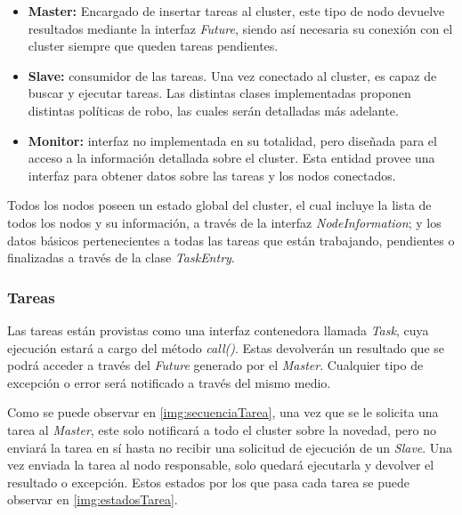 \documentclass[12pt,a4paper,oneside,spanish]{report}
\begin{document}
\begin{itemize}
	\item \textbf{Master:} Encargado de insertar tareas al cluster, este tipo de nodo devuelve resultados mediante la interfaz \textit{Future}, siendo así necesaria su conexión con el cluster siempre que queden tareas pendientes.
	\item \textbf{Slave:} consumidor de las tareas. Una vez conectado al cluster, es capaz de buscar y ejecutar tareas. Las distintas clases implementadas proponen distintas políticas de robo, las cuales serán detalladas más adelante.
	\item \textbf{Monitor:} interfaz no implementada en su totalidad, pero diseñada para el acceso a la información detallada sobre el cluster. Esta entidad provee una interfaz para obtener datos sobre las tareas y los nodos conectados.
\end{itemize}


Todos los nodos poseen un estado global del cluster, el cual incluye la lista de todos los nodos y su información, a través de la interfaz \textit{NodeInformation}; y los datos básicos pertenecientes a todas las tareas que están trabajando, pendientes o finalizadas a través de la clase \textit{TaskEntry}.


\subsubsection*{Tareas}

Las tareas están provistas como una interfaz contenedora llamada \textit{Task}, cuya ejecución estará a cargo del método \textit{call()}. Estas devolverán un resultado que se podrá acceder a través del \textit{Future} generado por el \textit{Master}. Cualquier tipo de excepción o error será notificado a través del mismo medio.


Como se puede observar en \ref{img:secuenciaTarea}, una vez que se le solicita una tarea al \textit{Master}, este solo notificará a todo el cluster sobre la novedad, pero no enviará la tarea en sí hasta no recibir una solicitud de ejecución de un \textit{Slave}. Una vez enviada la tarea al nodo responsable, solo quedará ejecutarla y devolver el resultado o excepción. Estos estados por los que pasa cada tarea se puede observar en \ref{img:estadosTarea}.
\end{document}

